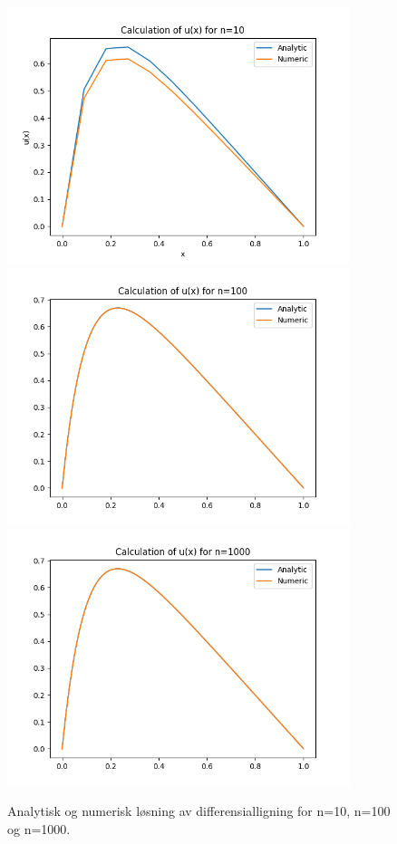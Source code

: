 \documentclass[a4paper,10pt,english]{article}
\begin{document}
\begin{figure}[h!]
	\centering
	\includegraphics[width=10cm]{plots/tridiagonal_n=10.png}
	\includegraphics[width=10cm]{plots/tridiagonal_n=100.png}
	\includegraphics[width=10cm]{plots/tridiagonal_n=1000.png}
	\caption{Analytisk og numerisk løsning av differensialligning for n=10, n=100 og n=1000.}
	\label{fig:tridiagonal}
\end{figure}
\end{document}
